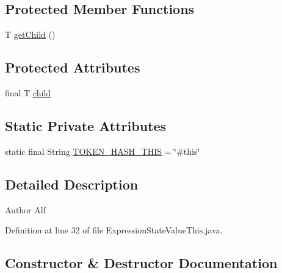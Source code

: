 \subsection*{Protected Member Functions}
\begin{DoxyCompactItemize}
\item 
T \hyperlink{classgov_1_1nasa_1_1jpf_1_1inspector_1_1server_1_1expression_1_1_expression_state_unary_operator_a150bac338d6557f79ca185d3f6ad6e06}{get\+Child} ()
\end{DoxyCompactItemize}
\subsection*{Protected Attributes}
\begin{DoxyCompactItemize}
\item 
final T \hyperlink{classgov_1_1nasa_1_1jpf_1_1inspector_1_1server_1_1expression_1_1_expression_state_unary_operator_a66041b1f569a361549e28a00f7ca5f2f}{child}
\end{DoxyCompactItemize}
\subsection*{Static Private Attributes}
\begin{DoxyCompactItemize}
\item 
static final String \hyperlink{classgov_1_1nasa_1_1jpf_1_1inspector_1_1server_1_1expression_1_1expressions_1_1_expression_state_value_this_a8b028a2a41eeb9c7f8a338a231a45f6e}{T\+O\+K\+E\+N\+\_\+\+H\+A\+S\+H\+\_\+\+T\+H\+IS} = \char`\"{}\#this\char`\"{}
\end{DoxyCompactItemize}


\subsection{Detailed Description}
\begin{DoxyAuthor}{Author}
Alf 
\end{DoxyAuthor}


Definition at line 32 of file Expression\+State\+Value\+This.\+java.



\subsection{Constructor \& Destructor Documentation}
